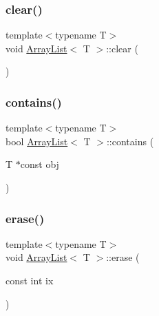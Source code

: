 \mbox{\label{classArrayList_acb53d54675318c94332d0ec8b6819eb3}} 
\subsubsection{\texorpdfstring{clear()}{clear()}}
{\footnotesize\ttfamily template$<$typename T$>$ \\
void \hyperlink{classArrayList}{Array\+List}$<$ T $>$\+::clear (\begin{DoxyParamCaption}{ }\end{DoxyParamCaption})\hspace{0.3cm}{\ttfamily [inline]}}

\mbox{\label{classArrayList_a934e6fc0664f4227194212c1dc73cbcb}} 
\subsubsection{\texorpdfstring{contains()}{contains()}}
{\footnotesize\ttfamily template$<$typename T$>$ \\
bool \hyperlink{classArrayList}{Array\+List}$<$ T $>$\+::contains (\begin{DoxyParamCaption}\item[{T $\ast$const}]{obj }\end{DoxyParamCaption})\hspace{0.3cm}{\ttfamily [inline]}}

\mbox{\label{classArrayList_ada0edc3b311f26d8b9611ffc6a0504c5}} 
\subsubsection{\texorpdfstring{erase()}{erase()}\hspace{0.1cm}{\footnotesize\ttfamily [1/2]}}
{\footnotesize\ttfamily template$<$typename T$>$ \\
void \hyperlink{classArrayList}{Array\+List}$<$ T $>$\+::erase (\begin{DoxyParamCaption}\item[{const int}]{ix }\end{DoxyParamCaption})\hspace{0.3cm}{\ttfamily [inline]}}

